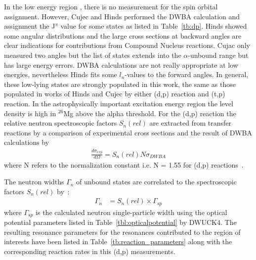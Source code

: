 {In the low energy region , there is no measurement for the spin orbital assignment. However, Cujec and Hinds  performed the DWBA calculation  and assignment the J$^{\pi}$ value for some states as listed in Table~\ref{tb:dp}.
Hinds showed some angular distributions and the large cross sections at backward angles are clear indications for   contributions from Compound Nucleus reactions. Cujac only measured two angles but the list of states extends into the $\alpha$-unbound range but has large energy errors. DWBA  calculations are not really appropriate at low energies, nevertheless Hinds fits some
$l_n$-values to the forward angles. In general, these low-lying states are strongly populated in this work, the same as those populated in works of Hinds and Cujec  by either (d,p) reaction and (t,p) reaction.
In the astrophysically important excitation energy region the  level density is high in $^{26}$Mg  above the alpha threshold. For the (d,p) reaction the relative neutron  spectroscopic factors $S_n(rel)$ are extracted from transfer reactions by a comparison of experimental cross sections and the result of DWBA calculations by
\begin{equation}
    \label{eq:S_n}
    \begin{aligned}
\frac{d\sigma_{exp}}{d\Omega} = S_n(rel) N \sigma_{DWBA}
        \end{aligned}
\end{equation}
where N refers to the normalization constant i.e. N = 1.55 for (d,p) reactions~\citep{DWUCK4}.

The neutron widths $\Gamma_{n}$ of unbound states are correlated to the spectroscopic factors $S_n(rel)$ by~\citep{SCHIFFER1963246}:
\begin{equation}
    \label{eq:width_n}
    \begin{aligned}
\Gamma_{n} &=  S_n(rel)\times \Gamma_{sp}
        \end{aligned}
\end{equation}
where $\Gamma_{sp}$ is the calculated neutron single-particle width using the optical potential parameters listed in Table~\ref{tbl:opticalpotential} by DWUCK4.
The resulting resonance parameters for the resonances contributed to the region of interests have  been listed in Table~\ref{tb:reaction_parameters} along with the corresponding reaction rates in this (d,p) measurements.

\begin{landscape}
\setlength{\capwidth}{0.7\textwidth}


\end{landscape}}
